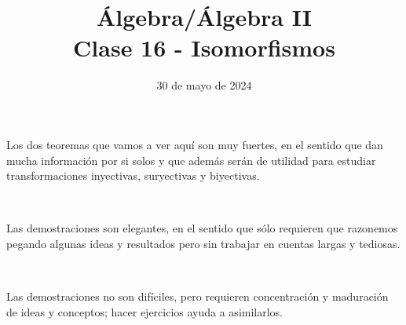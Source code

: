 \documentclass[handout]{beamer} %
\title[Clase 16 - Isomorfismos]{Álgebra/Álgebra II \\ Clase 16 - Isomorfismos}
\author[]{}
\institute[]{\normalsize FAMAF / UNC
	\\[\baselineskip] ${}^{}$
	\\[\baselineskip]
}
\date[30/05/20204]{30 de mayo de 2024}
\newcommand{\im}{\operatorname{Im}}
\renewcommand\nu{\operatorname{Nu}}
\begin{document}
\begin{frame}
\maketitle
\end{frame}




\begin{frame}
Los dos teoremas que vamos a ver aquí son muy fuertes, en el sentido que dan mucha información por si solos y que además serán de utilidad para estudiar transformaciones inyectivas, suryectivas y biyectivas.
\pause

\

Las demostraciones son elegantes, en el sentido que sólo requieren que razonemos pegando algunas ideas y resultados pero sin trabajar en cuentas largas y tediosas.
\pause

\

Las demostraciones no son difíciles, pero requieren concentración y maduración de ideas y conceptos; hacer ejercicios ayuda a asimilarlos.
\pause
\


\end{frame}


\end{document}
